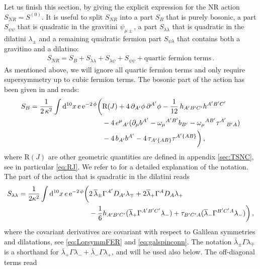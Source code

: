 \documentclass[a4paper,10pt,openany]{article}
\def\rme{\mathrm{e}}
\def\rmd{\mathrm{d}}
\def\rmR{\mathrm{R}}
\begin{document}
	Let us finish this section, by giving the explicit expression for the NR action $S_{NR} = S^{(0)}$. It is useful to split $S_{NR}$ into a part $S_B$ that is purely bosonic, a part $S_{\psi\psi}$ that is quadratic in the gravitini $\psi_{\mu\pm}$, a part $S_{\lambda\lambda}$ that is quadratic in the dilatini $\lambda_{\pm}$ and a remaining quadratic fermion part $S_{\psi\lambda}$ that contains both a gravitino and a dilatino:
	\begin{align}\label{eq:NRaction}
		S_{NR} = S_B + S_{\lambda\lambda} + S_{\lambda\psi} + S_{\psi\psi} + \text{quartic fermion terms} \,.
	\end{align}
	As mentioned above, we will ignore all quartic fermion terms and only require supersymmetry up to cubic fermion terms. The bosonic part of the action has been given in \cite{Bergshoeff:2021bmc} and reads:
	\begin{align} \label{eq:BosAction}
		S_B = \frac{1}{2\,\kappa^2}\int \rmd^{10}x \,e\,\rme^{-2\,\phi}\bigg(&\rmR(J)+4\,\partial_{A'}\phi\,\partial^{A'}\phi-\frac{1}{12}\,h_{A'B'C'}h^{A'B'C'} \notag\\
		&-4\,e^{\mu}{}_{A'}(\partial_{\mu} b^{A'}-\omega_{\mu}{}^{A'B'}b_{B'}-\omega_{\mu}{}^{AB'}\tau^{A'}{}_{B'A}) \\&- 4\,b_{A'}b^{A'}- 4\,\tau_{A'\{AB\}}\tau^{A'\{AB\}}  \bigg)\,,
	\end{align}
	where $\rmR(J)$ are other geometric quantities are defined in appendix \ref{sec:TSNC}, see in particular \eqref{eq:RJ}. We refer to \cite{Bergshoeff:2021bmc} for a detailed explanation of the notation. %
	The part of the action that is quadratic in the dilatini reads
	\begin{align} \label{eq:SNR2}
		S_{\lambda\lambda} = \frac{1}{2\kappa^2}\int \rmd^{10}x \,e\,\rme^{-2\,\phi}\bigg( &2\,\overline{\lambda}_{\pm}\Gamma^{A'}D_{A'}\lambda_{\mp}+
		2\overline{\lambda}_{+}\Gamma^{A}D_{A}\lambda_{+}\notag\\
		&-\frac{1}{6}h_{A'B'C'}(\overline{\lambda}_{+}\Gamma^{A'B'C'}\lambda_{-})+\tau_{B'C'A}(\overline{\lambda}_{-}\Gamma^{B'C'A}\lambda_{-})\bigg)\,,
	\end{align}
	where the covariant derivatives are covariant with respect to Galilean symmetries and dilatations, see \eqref{eq:LorsymmFER} and \eqref{eq:galspinconn}. The notation $\bar\lambda_\pm\Gamma \lambda_\mp$ is a shorthand for $\bar\lambda_+\Gamma\lambda_- + \bar\lambda_-\Gamma\lambda_+$, and will be used also below. The off-diagonal terms read
\end{document}
